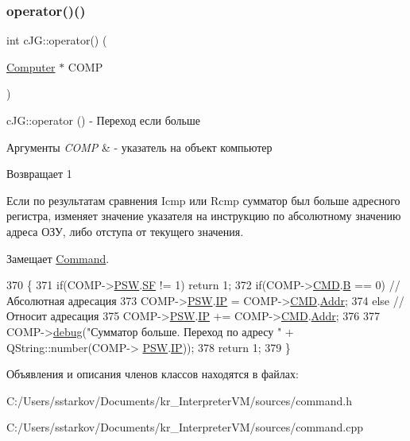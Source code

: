 \subsubsection{\texorpdfstring{operator()()}{operator()()}}
{\footnotesize\ttfamily int c\+J\+G\+::operator() (\begin{DoxyParamCaption}\item[{\hyperlink{class_computer}{Computer} $\ast$}]{C\+O\+MP }\end{DoxyParamCaption})\hspace{0.3cm}{\ttfamily [virtual]}}



c\+J\+G\+::operator () -\/ Переход если больше 


\begin{DoxyParams}{Аргументы}
{\em C\+O\+MP} & -\/ указатель на объект компьютер \\
\hline
\end{DoxyParams}
\begin{DoxyReturn}{Возвращает}
1
\end{DoxyReturn}
Если по результатам сравнения Icmp или Rcmp сумматор был больше адресного регистра, изменяет значение указателя на инструкцию по абсолютному значению адреса ОЗУ, либо отступа от текущего значения. 

Замещает \hyperlink{class_command_a79939b66f3de892e91d7710844294716}{Command}.


\begin{DoxyCode}
370 \{
371     \textcolor{keywordflow}{if}(COMP->\hyperlink{class_computer_aada011a29d87bb979835371a5f09805e}{PSW}.\hyperlink{struct_computer_1_1bits_a74cfe87f17ba348db37c74bbd5e56828}{SF} != 1) \textcolor{keywordflow}{return} 1;
372     \textcolor{keywordflow}{if}(COMP->\hyperlink{class_computer_a8423168f7cc356b4dd36977603798caf}{CMD}.\hyperlink{struct_computer_1_1command_a3e0d1e527de9f60594023a362b08a7de}{B} == 0) \textcolor{comment}{//Абсолютная адресация}
373         COMP->\hyperlink{class_computer_aada011a29d87bb979835371a5f09805e}{PSW}.\hyperlink{struct_computer_1_1bits_a7781883b446209714ad687e2a4f77526}{IP} = COMP->\hyperlink{class_computer_a8423168f7cc356b4dd36977603798caf}{CMD}.\hyperlink{struct_computer_1_1command_a0e07591012953413797506f7bc3cb1a7}{Addr};
374     \textcolor{keywordflow}{else} \textcolor{comment}{//Относит адресация}
375         COMP->\hyperlink{class_computer_aada011a29d87bb979835371a5f09805e}{PSW}.\hyperlink{struct_computer_1_1bits_a7781883b446209714ad687e2a4f77526}{IP} += COMP->\hyperlink{class_computer_a8423168f7cc356b4dd36977603798caf}{CMD}.\hyperlink{struct_computer_1_1command_a0e07591012953413797506f7bc3cb1a7}{Addr};
376 
377     COMP->\hyperlink{class_computer_a10ca6c6b200630119201de16d7368e0f}{debug}(\textcolor{stringliteral}{"Сумматор больше. Переход по адресу "} + QString::number(COMP->
      \hyperlink{class_computer_aada011a29d87bb979835371a5f09805e}{PSW}.\hyperlink{struct_computer_1_1bits_a7781883b446209714ad687e2a4f77526}{IP}));
378     \textcolor{keywordflow}{return} 1;
379 \}
\end{DoxyCode}


Объявления и описания членов классов находятся в файлах\+:\begin{DoxyCompactItemize}
\item 
C\+:/\+Users/sstarkov/\+Documents/kr\+\_\+\+Interpreter\+V\+M/sources/command.\+h\item 
C\+:/\+Users/sstarkov/\+Documents/kr\+\_\+\+Interpreter\+V\+M/sources/command.\+cpp\end{DoxyCompactItemize}
